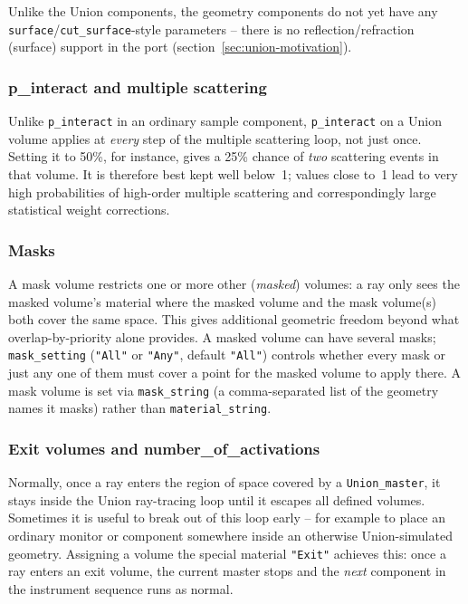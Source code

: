 Unlike the \MCS Union components, the \MCX geometry components do not yet
have any \texttt{surface}/\texttt{cut\_surface}-style parameters -- there
is no reflection/refraction (surface) support in the \MCX port
(section~\ref{sec:union-motivation}).

\subsubsection*{p\_interact and multiple scattering}
Unlike \texttt{p\_interact} in an ordinary \MCX sample component,
\texttt{p\_interact} on a Union volume applies at \emph{every} step of the
multiple scattering loop, not just once. Setting it to 50\%, for instance,
gives a 25\% chance of \emph{two} scattering events in that volume. It is
therefore best kept well below~1; values close to~1 lead to very high
probabilities of high-order multiple scattering and correspondingly large
statistical weight corrections.

\subsubsection{Masks}
\label{sec:union-masks}

A mask volume restricts one or more other (\emph{masked}) volumes: a ray
only sees the masked volume's material where the masked volume and the
mask volume(s) both cover the same space. This gives additional geometric
freedom beyond what overlap-by-priority alone provides. A masked volume
can have several masks; \texttt{mask\_setting} (\texttt{"All"} or
\texttt{"Any"}, default \texttt{"All"}) controls whether every mask or
just any one of them must cover a point for the masked volume to apply
there. A mask volume is set via \texttt{mask\_string} (a comma-separated
list of the geometry names it masks) rather than \texttt{material\_string}.

\subsubsection{Exit volumes and number\_of\_activations}
\label{sec:union-exit}

Normally, once a ray enters the region of space covered by a
\texttt{Union\_master}, it stays inside the Union ray-tracing loop until it
escapes all defined volumes. Sometimes it is useful to break out of this
loop early -- for example to place an ordinary \MCX monitor or component
somewhere inside an otherwise Union-simulated geometry. Assigning a volume
the special material \texttt{"Exit"} achieves this: once a ray enters an
exit volume, the current master stops and the \emph{next} \MCX component
in the instrument sequence runs as normal.

